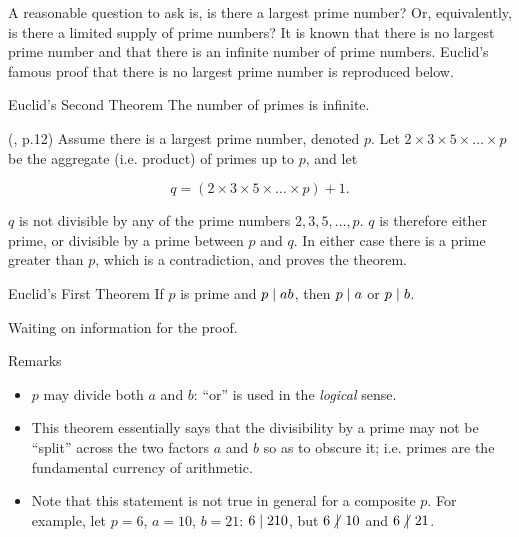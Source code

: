 A  reasonable question to ask is, is there a largest prime number?
Or, equivalently, is there a limited supply of prime numbers?  It is known
that there is no largest prime number and that there is an infinite number
of prime numbers.
Euclid's famous proof that there is no largest prime number is reproduced below.

\begin{vworktheoremstatementpar}{Euclid's Second Theorem}
The number of primes is infinite.%
\end{vworktheoremstatementpar}
\begin{vworktheoremproof}
(\cite{bibref:b:HardyAndWrightClassic}, p.12) Assume there is a largest
prime number, denoted $p$.  Let
$2 \times 3 \times 5 \times \ldots \times p$ be the aggregate (i.e. product)
of primes up to $p$, and let

\begin{equation}
q = (2 \times 3 \times 5 \times \ldots{} \times p) + 1.
\end{equation}

$q$ is not divisible by any of the prime numbers $2, 3, 5, \ldots{}, p$.  $q$
is therefore either prime, or divisible  by a prime between $p$ and $q$.  In
either case there is a prime greater than $p$, which is a contradiction, and
proves the theorem.
\end{vworktheoremproof}

\begin{vworktheoremstatementpar}{Euclid's First Theorem}
%
If $p$ is prime and $p \mid{} a b$, then $p \mid{} a$
or $p \mid{} b$.
\end{vworktheoremstatementpar}
\begin{vworktheoremproof}
Waiting on information for the proof.
\end{vworktheoremproof}
\begin{vworktheoremparsection}{Remarks}
\begin{itemize}
\item $p$ may divide both $a$ and $b$:  ``or'' is used in the \emph{logical} sense.
\item This theorem essentially says that the divisibility by a prime may
      not be ``split'' across the two factors $a$ and $b$ so as to obscure
      it; i.e. primes are the fundamental currency of arithmetic.
\item Note that this statement is not true in general for a composite $p$.
      For example, let $p = 6$, $a = 10$, $b = 21$:  $6 \mid{} 210$,
      but $6 \hspace{-0.125em}\not\hspace{0.245em}\mid\hspace{0.135em}{} 10$ and $6 \hspace{-0.125em}\not\hspace{0.245em}\mid\hspace{0.135em}{} 21$.

\end{itemize}
\end{vworktheoremparsection}

